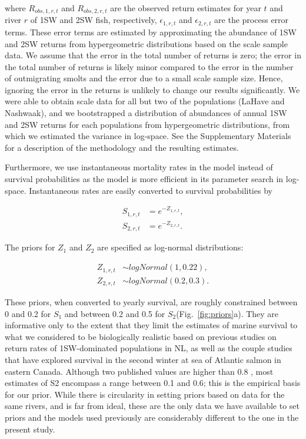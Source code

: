 \documentclass[12pt]{article}
\newcommand{\So}{$S_{1}$\xspace}
\newcommand{\St}{$S_{2}$\xspace}
\begin{document}
where $R_{obs,1,r,t}$ and $R_{obs,2,r,t}$ are the observed return estimates
for year $t$ and river $r$ of 1SW and 2SW fish, respectively, $\epsilon_{1,r,t}$
and $\epsilon_{2,r,t}$ are the process error terms.
These error terms are estimated by approximating the abundance of 1SW and 2SW returns
from hypergeometric distributions based on the scale sample data.
We assume that the error in the total number of returns is zero;
the error in the total number of returns is likely minor
compared to the error in the number of outmigrating smolts and the error due to
a small scale sample size. Hence, ignoring the error in the returns is
unlikely to change our results significantly.
We were able to obtain scale data for all but two of the populations (LaHave and Nashwaak), and we
bootstrapped a distribution of abundances of annual 1SW and 2SW returns for each populations from hypergeometric distributions,
from which we estimated the variance in log-space.
See the Supplementary Materials for a description of the methodology and the resulting estimates.

Furthermore, we use instantaneous mortality rates in the model instead of
survival probabilities as the model is more efficient in its parameter search
in log-space. Instantaneous rates are easily converted to survival
probabilities by

\begin{align}
 S_{1,r,t} &= e^{-Z_{1,r,t}}, \\
 S_{2,r,t} &= e^{-Z_{2,r,t}}.
\end{align}

The priors for $Z_1$ and $Z_2$ are specified as log-normal distributions:

\begin{align}
Z_{1,r,t} &\sim logNormal(1, 0.22),   \\
Z_{2,r,t} &\sim logNormal(0.2, 0.3).
\end{align}

These priors, when converted to yearly survival, are roughly constrained between
0 and 0.2 for \So and between 0.2 and 0.5 for \St (Fig.~\ref{fig:priors}a). They are
informative only to the extent that they limit the estimates of marine survival
to what we considered to be biologically realistic based on previous studies on
return rates of 1SW-dominated populations in NL, as well as the couple studies
that have explored survival in the second winter at sea of Atlantic salmon in
eastern Canada.
Although two published values are higher than 0.8 \citep{Chaput2003b,Hubley2011}, most estimates of S2 encompass a range between 0.1 and 0.6; this is the empirical basis for our prior.
While there is circularity in setting priors based on data for the same rivers,
and is far from ideal, these are the only data we have available to set priors
and the models used previously are considerably different to the one in the present study.
\end{document}
